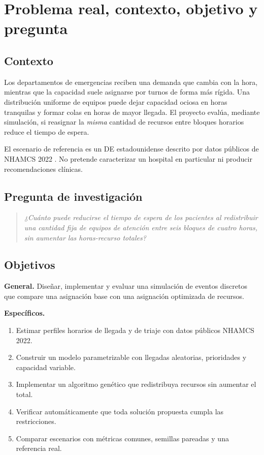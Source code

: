 \section{Problema real, contexto, objetivo y pregunta}

\subsection{Contexto}
Los departamentos de emergencias reciben una demanda que cambia con la hora, mientras que
la capacidad suele asignarse por turnos de forma más rígida. Una distribución uniforme de
equipos puede dejar capacidad ociosa en horas tranquilas y formar colas en horas de mayor
llegada. El proyecto evalúa, mediante simulación, si reasignar la \emph{misma} cantidad de
recursos entre bloques horarios reduce el tiempo de espera.

El escenario de referencia es un DE estadounidense descrito por datos públicos de NHAMCS
2022 \citep{nhamcs2022doc}. No pretende caracterizar un hospital en particular ni producir
recomendaciones clínicas.

\subsection{Pregunta de investigación}
\begin{quote}
\emph{¿Cuánto puede reducirse el tiempo de espera de los pacientes al redistribuir una
cantidad fija de equipos de atención entre seis bloques de cuatro horas, sin aumentar las
horas-recurso totales?}
\end{quote}

\subsection{Objetivos}
\textbf{General.} Diseñar, implementar y evaluar una simulación de eventos discretos que
compare una asignación base con una asignación optimizada de recursos.

\textbf{Específicos.}
\begin{enumerate}
  \item Estimar perfiles horarios de llegada y de triaje con datos públicos NHAMCS 2022.
  \item Construir un modelo parametrizable con llegadas aleatorias, prioridades y capacidad
  variable.
  \item Implementar un algoritmo genético que redistribuya recursos sin aumentar el total.
  \item Verificar automáticamente que toda solución propuesta cumpla las restricciones.
  \item Comparar escenarios con métricas comunes, semillas pareadas y una referencia real.
\end{enumerate}

